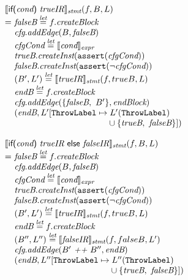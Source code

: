 \[
\begin{array}{l@{}l@{~}l}
\lefteqn{\transfun{\ircfgif{\emph{cond}}{\emph{trueIR}}}_{\emph{stmt}}(f, B, L)}\\
& = & \emph{falseB} \letval f.\emph{createBlock}\\
& & \emph{cfg}.\emph{addEdge}(B, \emph{falseB})\\
& & \emph{cfgCond} \letval \transfun{\emph{cond}}_{\emph{expr}}\\
& & \emph{trueB}.\emph{createInst}(\TT{assert}(\emph{cfgCond}))\\
& & \emph{falseB}.\emph{createInst}(\TT{assert}(\neg \emph{cfgCond}))\\
& & (B', L') \letval \transfun{\emph{trueIR}}_{\emph{stmt}}(f, trueB, L)\\
& & \emph{endB} \letval f.\emph{createBlock}\\
& & \emph{cfg}.\emph{addEdge}(\{ \emph{falseB},\ B' \}, \emph{endBlock})\\
& & (\emph{endB}, L'[\ThrowLabel \mapsto L'(\ThrowLabel)\\
& & \phantom{(\emph{endB}, L'[\ThrowLabel \mapsto}
 \cup \{ \emph{trueB},\ \emph{falseB} \}])\\
& & \\

\lefteqn{\transfun{\irifelse{\emph{cond}}{\emph{trueIR}}{\emph{falseIR}}}_{\emph{stmt}}(f, B, L)}\\
& = & \emph{falseB} \letval f.\emph{createBlock}\\
& & \emph{cfg}.\emph{addEdge}(B, \emph{falseB})\\
& & \emph{cfgCond} \letval \transfun{\emph{cond}}_{\emph{expr}}\\
& & \emph{trueB}.\emph{createInst}(\TT{assert}(\emph{cfgCond}))\\
& & \emph{falseB}.\emph{createInst}(\TT{assert}(\neg \emph{cfgCond}))\\
& & (B', L') \letval \transfun{\emph{trueIR}}_{\emph{stmt}}(f, trueB, L)\\
& & \emph{endB} \letval f.\emph{createBlock}\\
& & (B'', L'') \letval \transfun{\emph{falseIR}}_{\emph{stmt}}(f, falseB, L')\\
& & \emph{cfg}.\emph{addEdge}(B' ~\emph{++}~ B'', \emph{endB})\\
& & (\emph{endB}, L''[\ThrowLabel \mapsto L''(\ThrowLabel)\\
& & \phantom{(\emph{endB}, L''[\ThrowLabel \mapsto}
\cup \{ \emph{trueB},\ \emph{falseB} \}])\\
& & \\


\end{array}\]
